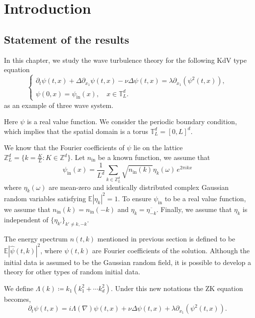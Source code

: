 \section{Introduction}

\subsection{Statement of the results}
In this chapter, we study the wave turbulence theory for the following KdV type equation
\begin{equation}\tag{MKDV}\label{eq.MKDV.threewave}
\begin{cases}
\partial_t\psi(t,x)+\Delta\partial_{x_1}\psi(t,x)-\nu \Delta \psi(t,x)=\lambda \partial_{x_1}(\psi^2(t,x)),\\[.6em]
\psi(0,x) = \psi_{\textrm{in}}(x), \quad x\in \mathbb{T}^d_{L}.
\end{cases}    
\end{equation}
as an example of three wave system.

Here $\psi$ is a real value function. We consider the periodic boundary condition, which implies that the spatial domain is a torus $\mathbb{T}^d_{L}=[0,L]^d$. 

We know that the Fourier coefficients of $\psi$ lie on the lattice $\mathbb{Z}_L^d = \{k=\frac{K}{L}:K\in \mathbb{Z}^d\}$. Let $n_{\textrm{in}}$ be a known function, we assume that
\begin{equation}\label{eq.wellprepared.threewave}
\psi_{\textrm{in}}(x)=\frac{1}{L^d}\sum_{k\in\mathbb{Z}^d_L}\sqrt{n_{\textrm{in}}(k)} \eta_k(\omega)\,  e^{2\pi i kx}
\end{equation}
where $\eta_k(\omega)$ are mean-zero and identically distributed complex Gaussian random variables satisfying $\mathbb E |\eta_k|^2=1$. To ensure $\psi_{\textrm{in}}$ to be a real value function, we assume that $n_{\textrm{in}}(k)=n_{\textrm{in}}(-k)$ and $\eta_k=\overline{\eta_{-k}}$. Finally, we assume that $\eta_k$ is independent of $\{\eta_{k'}\}_{k'\ne k,-k}$.


The energy spectrum $n(t,k)$ mentioned in previous section is defined to be $\mathbb E |\widehat \psi(t, k)|^2$, where $\psi(t, k)$ are Fourier coefficients of the solution. Although the initial data is assumed to be the Gaussian random field, it is possible to develop a theory for other types of random initial data.


We define $\Lambda(k)\coloneqq k_{1}(k_1^2+\cdots k_d^2)$. Under this new notations the ZK equation becomes,
\[
\partial_t\psi(t,x)=i\Lambda(\nabla)\psi(t,x)+\nu \Delta \psi(t,x)+\lambda \partial_{x_1}(\psi^2(t,x)).
\]

